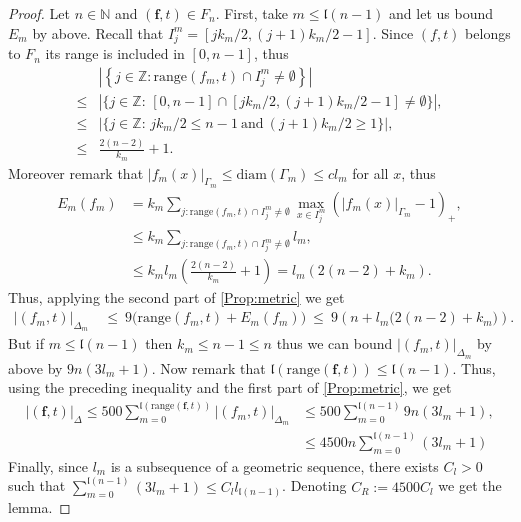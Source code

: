 \documentclass[english, 11pt, a4paper]{article}
\theoremstyle{definition}
\numberwithin{equation}{section}
\newcommand{\bN}{\mathbb{N}}
\newcommand{\bZ}{\mathbb{Z}}
\newcommand{\diam}[1]{\mathrm{diam}\left( {#1} \right)}
\newcommand{\mbff}{\boldsymbol{f}}
\newcommand{\BZ}{\Delta}
\newcommand{\range}{\mathrm{range}}
\newcommand{\landing}{\mathfrak{l}}
\newcommand{\Cdiam}{C_R}
\newcommand{\Clm}{c}
\begin{document}
\begin{proof} Let $n \in \bN$ and $(\mbff,t) \in F_n$. 
  First, take $m\leq \landing(n-1)$ and let us bound $E_m$ by above. Recall that
  $I^m_j=[jk_m/2,(j+1)k_m/2-1]$. Since $(f,t)$ belongs to $F_{n}$ its range is
  included in $[0,n-1]$, thus 
  \begin{align*}
    &\left\vert\left\{j \in \bZ: \range(f_m,t)\cap I^m_j \neq \emptyset\right\} \right\vert\\
    \leq&
      \left\vert \big\{j \in \bZ:\, [0,n-1]\cap [jk_m/2,(j+1)k_m/2-1]
      \neq \emptyset\big\} \right\vert,\\
    \leq& \left\vert \big\{j \in \bZ:\, jk_m/2\leq n -1\
      \text{and}\ (j+1)k_m/2\geq 1 \big\} \right\vert,\\
    \leq& \frac{2(n-2)}{k_m} + 1.
  \end{align*}
  Moreover remark that $|f_m(x)|_{\Gamma_m} \leq \diam{\Gamma_m} \leq \Clm l_m$
  for all $x$, thus 
  \begin{align*}
    E_m(f_m)
    &=  k_m \sum_{j: \range(f_m,t)\cap I^m_j \neq \emptyset}
      \max_{x\in I^m_j} \left( |f_m(x)|_{\Gamma_m}-1 \right)_{+},\\
    &\leq k_m  \sum_{j: \range(f_m,t)\cap I^m_j \neq \emptyset} l_m,\\
    &\leq k_m l_m \left(\frac{2(n-2)}{k_m}+1\right)=l_m(2(n-2)+k_m).
  \end{align*}
  Thus, applying the second part of \cref{Prop:metric} we get
  \begin{align*}
    |(f_m,t)|_{\BZ_m}\ &\leq\  9 \big( \range(f_m,t) + E_m(f_m)  \big) %
   \  \leq\  9\left(n +l_m\big(2(n-2)+k_m\big)\right).
  \end{align*}
  But if $m\leq\landing(n-1)$ then $k_m\leq n-1 \leq n$ thus we can bound $
  |(f_m,t)|_{\BZ_m}$ by above by $9n(3l_m+1)$. Now remark that
  $\landing\left(\range(\mbff,t) \right)\leq \landing(n-1)$. Thus, 
  using the preceding inequality and the first part of \cref{Prop:metric}, we
  get
  \begin{align*}
    \left\vert {(\mbff,t)}\right\vert_{\BZ}
     \leq 500 \sum^{\landing\left( \range(\mbff,t) \right)}_{m=0} |(f_m,t)|_{\BZ_m}%
    & \leq 500 \sum^{\landing (n-1)}_{m=0} 9n\left(3l_m+1\right),\\
    & \leq 4500 n \sum^{\landing (n-1)}_{m=0}\left(3l_m+1  \right)
  \end{align*}
  Finally, since $l_m$ is a subsequence of a geometric sequence, there exists
  $C_l>0$ such that $ \sum^{\landing (n-1)}_{m=0}\left(3l_m+1  \right)\leq C_l
  l_{\landing (n-1)}$. Denoting $\Cdiam:=4500 C_l$ we get the lemma.
\end{proof}
\end{document}
